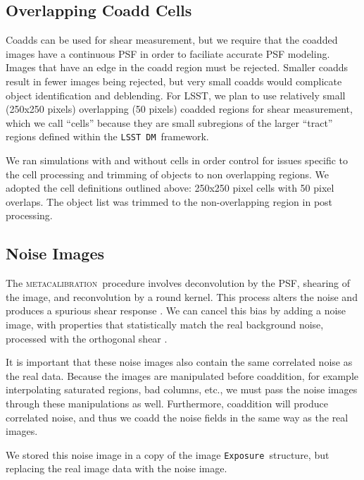 \documentclass[twocolumn,twocolappendix,astrosym]{openjournal}
\newcommand{\calexp}{\texttt{Exposure}}
\newcommand{\dm}{\texttt{LSST DM}}
\newcommand{\mcal}{\textsc{metacalibration}}
\begin{document}
\subsection{Overlapping Coadd Cells} \label{sec:sim:cells}

Coadds can be used for shear measurement\citep{ArmstrongCoadd}, but we require
that the coadded images have a continuous PSF in order to faciliate accurate
PSF modeling.  Images that have an edge in the coadd region must be rejected.
Smaller coadds result in fewer images being rejected, but very small coadds
would complicate object identification and deblending.  For LSST, we plan to
use relatively small (250x250 pixels) overlapping (50 pixels) coadded regions
for shear measurement, which we call ``cells'' because they are small
subregions of the larger ``tract'' regions defined within the \dm\ framework.

We ran simulations with and without cells in order control for issues specific
to the cell processing and trimming of objects to non overlapping regions.  We
adopted the cell definitions outlined above: 250x250 pixel cells with 50 pixel
overlaps. The object list was trimmed to the non-overlapping region in post
processing.

\subsection{Noise Images} \label{sec:sim:noiseimages}

The \mcal\ procedure involves deconvolution by the PSF, shearing of the image,
and reconvolution by a round kernel.  This process alters the noise and
produces a spurious shear response \citep{SheldonMcal2017}.  We can cancel this
bias by adding a noise image, with properties that statistically match the real
background noise, processed with the orthogonal shear
\citep{SheldonMcal2017,mdet20}.

It is important that these noise images also contain the same correlated noise
as the real data.  Because the images are manipulated before coaddition, for
example interpolating saturated regions, bad columns, etc., we must pass the
noise images through these manipulations as well.  Furthermore,  coaddition
will produce correlated noise, and thus we coadd the noise fields in the same
way as the real images.

We stored this noise image in a copy of the image \calexp\ structure, but
replacing the real image data with the noise image.
\end{document}
